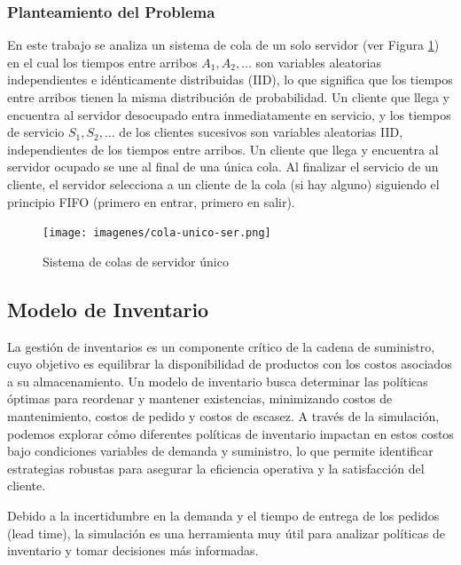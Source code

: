 \documentclass{article}
\begin{document}
\subsubsection{Planteamiento del Problema}
En este trabajo se analiza un sistema de cola de un solo servidor (ver Figura \ref{fig:cola-unico}) en el cual los tiempos entre arribos \(A_1, A_2, \ldots\) son variables aleatorias independientes e idénticamente distribuidas (IID), lo que significa que los tiempos entre arribos tienen la misma distribución de probabilidad. Un cliente que llega y encuentra al servidor desocupado entra inmediatamente en servicio, y los tiempos de servicio \(S_1, S_2, \ldots\) de los clientes sucesivos son variables aleatorias IID, independientes de los tiempos entre arribos. Un cliente que llega y encuentra al servidor ocupado se une al final de una única cola. Al finalizar el servicio de un cliente, el servidor selecciona a un cliente de la cola (si hay alguno) siguiendo el principio FIFO (primero en entrar, primero en salir).
\begin{figure}[H]
    \centering
    \texttt{[image: imagenes/cola-unico-ser.png]}
    \caption{Sistema de colas de servidor único}
    \label{fig:cola-unico}
\end{figure}








\vspace{1em}

\subsection{Modelo de Inventario}
La gestión de inventarios es un componente crítico de la cadena de suministro, cuyo objetivo es equilibrar la disponibilidad de productos con los costos asociados a su almacenamiento. Un modelo de inventario busca determinar las políticas óptimas para reordenar y mantener existencias, minimizando costos de mantenimiento, costos de pedido y costos de escasez. A través de la simulación, podemos explorar cómo diferentes políticas de inventario impactan en estos costos bajo condiciones variables de demanda y suministro, lo que permite identificar estrategias robustas para asegurar la eficiencia operativa y la satisfacción del cliente.

Debido a la incertidumbre en la demanda y el tiempo de entrega de los pedidos (lead time), la simulación es una herramienta muy útil para analizar políticas de inventario y tomar decisiones más informadas.
\end{document}
